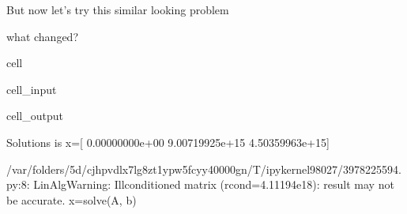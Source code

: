 \documentclass[letterpaper,10pt,english]{jupyterBook}
\begin{document}
\sphinxAtStartPar
But now let’s try this similar looking problem

\sphinxAtStartPar
{} what changed?

\begin{sphinxuseclass}{cell}\begin{sphinxVerbatimInput}

\begin{sphinxuseclass}{cell_input}
\begin{sphinxVerbatim}[commandchars=\\\{\}]
   
   
  \PYG{p}{[}\PYG{p}{[}  \PYG{p}{]}
     \PYG{p}{[}  \PYG{p}{]}
     \PYG{p}{[}  \PYG{p}{]}\PYG{p}{]}
    
    
 
\end{sphinxVerbatim}

\end{sphinxuseclass}\end{sphinxVerbatimInput}
\begin{sphinxVerbatimOutput}

\begin{sphinxuseclass}{cell_output}
\begin{sphinxVerbatim}[commandchars=\\\{\}]
Solutions is x=[ 0.00000000e+00 \PYGZhy{}9.00719925e+15  4.50359963e+15]
\end{sphinxVerbatim}

\begin{sphinxVerbatim}[commandchars=\\\{\}]
/var/folders/5d/cjhpvdlx7lg8zt1ypw5fcyy40000gn/T/ipykernel\PYGZus{}98027/3978225594.py:8: LinAlgWarning: Ill\PYGZhy{}conditioned matrix (rcond=4.11194e\PYGZhy{}18): result may not be accurate.
  x=solve(A, b)
\end{sphinxVerbatim}

\end{sphinxuseclass}\end{sphinxVerbatimOutput}

\end{sphinxuseclass}
\end{document}
